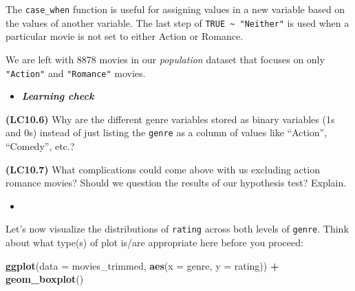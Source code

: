 \documentclass[12pt,]{krantz}
\makeatletter
\newenvironment{Shaded}{\begin{snugshade}}{\end{snugshade}}
\newcommand{\KeywordTok}[1]{\textcolor[rgb]{0.27,0.27,0.27}{\textbf{#1}}}
\newcommand{\DataTypeTok}[1]{\textcolor[rgb]{0.27,0.27,0.27}{#1}}
\newcommand{\DecValTok}[1]{\textcolor[rgb]{0.06,0.06,0.06}{#1}}
\newcommand{\StringTok}[1]{\textcolor[rgb]{0.5,0.5,0.5}{#1}}
\newcommand{\OtherTok}[1]{\textcolor[rgb]{0.37,0.37,0.37}{#1}}
\newcommand{\OperatorTok}[1]{\textcolor[rgb]{0.43,0.43,0.43}{\textbf{#1}}}
\newcommand{\NormalTok}[1]{#1}
\newenvironment{kframe}{%
\medskip{}
\setlength{\fboxsep}{.8em}
 \def\at@end@of@kframe{}%
 \ifinner\ifhmode%
  \def\at@end@of@kframe{\end{minipage}}%
  \begin{minipage}{\columnwidth}%
 \fi\fi%
 \def\FrameCommand##1{\hskip\@totalleftmargin \hskip-\fboxsep
 \colorbox{shadecolor}{##1}\hskip-\fboxsep
     \hskip-\linewidth \hskip-\@totalleftmargin \hskip\columnwidth}%
 \MakeFramed {\advance\hsize-\width
   \@totalleftmargin\z@ \linewidth\hsize
   \@setminipage}}%
 {\par\unskip\endMakeFramed%
 \at@end@of@kframe}
\renewenvironment{Shaded}{\begin{kframe}}{\end{kframe}}
\newenvironment{rmdblock}[1]
  {\begin{shaded*}
  \begin{itemize}
  \renewcommand{\labelitemi}{
    \raisebox{-.7\height}[0pt][0pt]{
    }
  }
  \item
  }
  {
  \end{itemize}
  \end{shaded*}
  }
\newenvironment{learncheck}
  {\begin{rmdblock}{warning}}
  {\end{rmdblock}}
\theoremstyle{definition}
\theoremstyle{definition}
\theoremstyle{definition}
\theoremstyle{remark}
\makeatother
\begin{document}
\begin{Shaded}
\end{Shaded}

The \texttt{case\_when} function is useful for assigning values in a new
variable based on the values of another variable. The last step of
\texttt{TRUE\ \textasciitilde{}\ "Neither"} is used when a particular
movie is not set to either Action or Romance.

We are left with 8878 movies in our \emph{population} dataset that
focuses on only \texttt{"Action"} and \texttt{"Romance"} movies.

\begin{learncheck}
\textbf{\emph{Learning check}}
\end{learncheck}

\textbf{(LC10.6)} Why are the different genre variables stored as binary
variables (1s and 0s) instead of just listing the \texttt{genre} as a
column of values like ``Action'', ``Comedy'', etc.?

\textbf{(LC10.7)} What complications could come above with us excluding
action romance movies? Should we question the results of our hypothesis
test? Explain.

\begin{learncheck}

\end{learncheck}

Let's now visualize the distributions of \texttt{rating} across both
levels of \texttt{genre}. Think about what type(s) of plot is/are
appropriate here before you proceed:

\begin{Shaded}
\begin{Highlighting}[]
\KeywordTok{ggplot}\NormalTok{(}\DataTypeTok{data =}\NormalTok{ movies_trimmed, }\KeywordTok{aes}\NormalTok{(}\DataTypeTok{x =}\NormalTok{ genre, }\DataTypeTok{y =}\NormalTok{ rating)) }\OperatorTok{+}
\StringTok{  }\KeywordTok{geom_boxplot}\NormalTok{()}
\end{Highlighting}
\end{Shaded}
\end{document}
